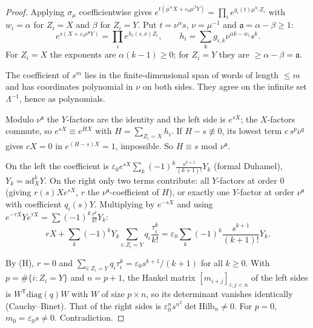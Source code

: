 \begin{proof}
Applying $\sigma_\mu$ coefficientwise gives $e^{t(\mu^\alpha X+\varepsilon_0\mu^\beta Y)}=\prod_ie^{g_i(t)\mu^{w_i}Z_i}$ with $w_i=\alpha$ for $Z_i=X$ and $\beta$ for $Z_i=Y$. Put $t=\nu^\alpha s$, $\nu=\mu^{-1}$ and $\mathfrak a=\alpha-\beta\ge1$:
\[
e^{s(X+\varepsilon_0\nu^{\mathfrak a}Y)}=\prod_ie^{h_i(s,\nu)Z_i},\qquad h_i=\sum_kg_{i,k}\nu^{\alpha k-w_i}s^k.
\]
For $Z_i=X$ the exponents are $\alpha(k-1)\ge0$; for $Z_i=Y$ they are $\ge\alpha-\beta=\mathfrak a$.

The coefficient of $s^m$ lies in the finite-dimensional span of words of length $\le m$ and has coordinates polynomial in $\nu$ on both sides. They agree on the infinite set $\Lambda^{-1}$, hence as polynomials.

Modulo $\nu^{\mathfrak a}$ the $Y$-factors are the identity and the left side is $e^{sX}$; the $X$-factors commute, so $e^{sX}\equiv e^{HX}$ with $H=\sum_{Z_i=X}h_i$. If $H-s\not\equiv0$, its lowest term $c\,s^p\nu^q$ gives $cX=0$ in $e^{(H-s)X}=1$, impossible. So $H\equiv s$ mod $\nu^{\mathfrak a}$.

On the left the coefficient is $\varepsilon_0e^{sX}\sum_k(-1)^k\frac{s^{k+1}}{(k+1)!}Y_k$ (formal Duhamel), $Y_k=\mathrm{ad}_X^kY$. On the right only two terms contribute: all $Y$-factors at order $0$ (giving $r(s)Xe^{sX}$, $r$ the $\nu^{\mathfrak a}$-coefficient of $H$), or exactly one $Y$-factor at order $\nu^{\mathfrak a}$ with coefficient $q_i(s)Y$. Multiplying by $e^{-sX}$ and using $e^{-\tau X}Ye^{\tau X}=\sum(-1)^k\frac{\tau^k}{k!}Y_k$:
\[
rX+\sum_k(-1)^kY_k\sum_{i:Z_i=Y}q_i\frac{\tau_i^k}{k!}=\varepsilon_0\sum_k(-1)^k\frac{s^{k+1}}{(k+1)!}Y_k.
\]

By (H), $r=0$ and $\sum_{i:Z_i=Y}q_i\tau_i^k=\varepsilon_0s^{k+1}/(k+1)$ for all $k\ge0$. With $p=\#\{i:Z_i=Y\}$ and $n=p+1$, the Hankel matrix $[m_{i+j}]_{i,j<n}$ of the left sides is $W^{\mathsf T}\mathrm{diag}(q)W$ with $W$ of size $p\times n$, so its determinant vanishes identically (Cauchy--Binet). That of the right sides is $\varepsilon_0^ns^{n^2}\det\mathrm{Hilb}_n\ne0$. For $p=0$, $m_0=\varepsilon_0s\ne0$. Contradiction.

\end{proof}

